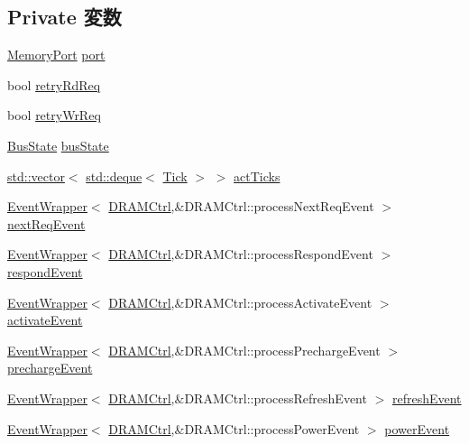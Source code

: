 \subsection*{Private 変数}
\begin{DoxyCompactItemize}
\item 
\hyperlink{classDRAMCtrl_1_1MemoryPort}{MemoryPort} \hyperlink{classDRAMCtrl_a55c076720c982014096b57cadebf9a14}{port}
\item 
bool \hyperlink{classDRAMCtrl_aa4e05579e39e0e1ae7859ddba8538932}{retryRdReq}
\item 
bool \hyperlink{classDRAMCtrl_acf0d3616b5317008b8248aa2245df220}{retryWrReq}
\item 
\hyperlink{classDRAMCtrl_a167375ed712267f43fee8fa5d1aa4f11}{BusState} \hyperlink{classDRAMCtrl_a898cc5ed4c5a9ec9c13dbe52d1ea0eb2}{busState}
\item 
\hyperlink{classstd_1_1vector}{std::vector}$<$ \hyperlink{classstd_1_1deque}{std::deque}$<$ \hyperlink{base_2types_8hh_a5c8ed81b7d238c9083e1037ba6d61643}{Tick} $>$ $>$ \hyperlink{classDRAMCtrl_a4a4e224ac2ca35b6d47a3ff850e1ff3e}{actTicks}
\item 
\hyperlink{classEventWrapper}{EventWrapper}$<$ \hyperlink{classDRAMCtrl_1_1DRAMCtrl}{DRAMCtrl},\&DRAMCtrl::processNextReqEvent $>$ \hyperlink{classDRAMCtrl_a6f6c894e157329404d6b23503c4fa62e}{nextReqEvent}
\item 
\hyperlink{classEventWrapper}{EventWrapper}$<$ \hyperlink{classDRAMCtrl_1_1DRAMCtrl}{DRAMCtrl},\&DRAMCtrl::processRespondEvent $>$ \hyperlink{classDRAMCtrl_a31bec941f92f261930a6df5cf9fb166e}{respondEvent}
\item 
\hyperlink{classEventWrapper}{EventWrapper}$<$ \hyperlink{classDRAMCtrl_1_1DRAMCtrl}{DRAMCtrl},\&DRAMCtrl::processActivateEvent $>$ \hyperlink{classDRAMCtrl_ad15dbdabb028b909655b32ab9e322e50}{activateEvent}
\item 
\hyperlink{classEventWrapper}{EventWrapper}$<$ \hyperlink{classDRAMCtrl_1_1DRAMCtrl}{DRAMCtrl},\&DRAMCtrl::processPrechargeEvent $>$ \hyperlink{classDRAMCtrl_a80cac8f63f85f5c7781367b8b728750f}{prechargeEvent}
\item 
\hyperlink{classEventWrapper}{EventWrapper}$<$ \hyperlink{classDRAMCtrl_1_1DRAMCtrl}{DRAMCtrl},\&DRAMCtrl::processRefreshEvent $>$ \hyperlink{classDRAMCtrl_a0bc8ce4f4a849871eb32bd983b5d2843}{refreshEvent}
\item 
\hyperlink{classEventWrapper}{EventWrapper}$<$ \hyperlink{classDRAMCtrl_1_1DRAMCtrl}{DRAMCtrl},\&DRAMCtrl::processPowerEvent $>$ \hyperlink{classDRAMCtrl_afb2cbddd4a31e9a3b11886230f18f44b}{powerEvent}

\end{DoxyCompactItemize}
